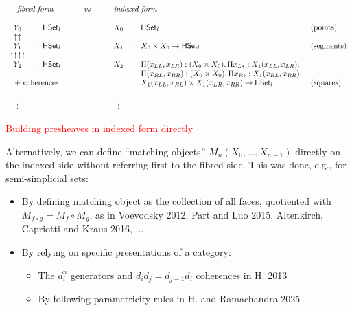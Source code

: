 \documentclass[12pt,landscape]{article}
\begin{document}
\begin{Large}
\begin{sf}
$$
\begin{array}{cllccllll}
\multicolumn{3}{c}{\mbox{\emph{fibred form}}} & \qquad\mathit{vs}\qquad & \multicolumn{3}{l}{\mbox{\emph{indexed form}}} \\
\\
Y_0 &:& \HSet_l & & X_0 & : & \HSet_l & \mbox{(points)}\\
\uparrow\uparrow \\
Y_1 &:& \HSet_l & & X_1 & : & X_0 \times X_0 \rightarrow \HSet_l & \mbox{(segments)}\\
\uparrow\uparrow\uparrow\uparrow \\
Y_2 &:& \HSet_l & & X_2 & : & \Pi (x_{LL},x_{LR}):(X_0 \times X_0).\, \Pi x_{L*}:X_1 (x_{LL},x_{LR}).\\
& & & & & & \Pi (x_{RL},x_{RR}):(X_0 \times X_0).\, \Pi x_{R*}:X_1 (x_{RL},x_{RR}).\, \\
\multicolumn{3}{c}{\mbox{~+ coherences}} & & & & X_1 (x_{LL},x_{RL}) \times X_1 (x_{LR},x_{RR}) \rightarrow \HSet_l \qquad & \mbox{(squares)}\\
\\
\vdots & & & & \vdots\\
\end{array}
$$

\newpage

\begin{center}
\textcolor{red}{\huge Building presheaves in indexed form directly}
\end{center}

\bigskip

Alternatively, we can define ``matching objects''
$M_n(X_0,...,X_{n-1})$ directly on the indexed side without referring
first to the fibred side. This was done, e.g., for semi-simplicial sets:

\begin{itemize}
\item By defining matching object as the collection of
  all faces, quotiented with $M_{f \circ g} = M_f \circ M_g$, as
  in Voevodsky 2012, Part and Luo 2015, Altenkirch, Capriotti and Kraus 2016, ...
\item By relying on specific presentations of a category:
\begin{itemize}
\item The $d^n_i$ generators and $d_id_j = d_{j-1}d_i$ coherences in H. 2013
\item By following parametricity rules in H. and Ramachandra 2025
\end{itemize}
\end{itemize}


\end{sf}
\end{Large}
\end{document}
